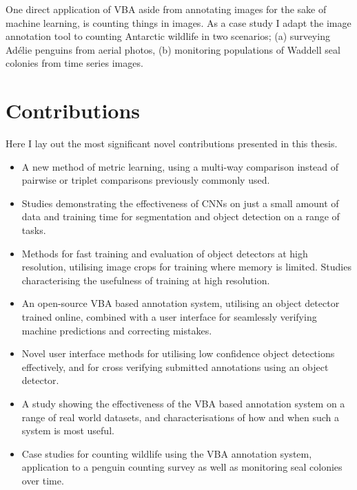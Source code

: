 One direct application of \gls{VBA} aside from annotating images for the sake of machine learning, is counting things in images. As a case study I adapt the image annotation tool to counting Antarctic wildlife in two scenarios; (a) surveying Ad\'elie penguins from aerial photos, (b) monitoring populations of Waddell seal colonies from time series images.

\section {Contributions}
\label{sec: contributions}

Here I lay out the most significant novel contributions presented in this thesis. 

\begin{itemize}

    \item A new method of metric learning, using a multi-way comparison instead of pairwise or triplet comparisons previously commonly used.
    
    \item Studies demonstrating the effectiveness of \gls{CNN}s on just a small amount of data and training time for segmentation and object detection on a range of tasks.
    
    \item Methods for fast training and evaluation of object detectors at high resolution, utilising image crops for training where memory is limited. Studies characterising the usefulness of training at high resolution.    
    
    \item An open-source \gls{VBA} based annotation system, utilising an object detector trained online, combined with a user interface for seamlessly verifying machine predictions and correcting mistakes.

    \item Novel user interface methods for utilising low confidence object detections effectively, and for cross verifying submitted annotations using an object detector.
    
    \item A study showing the effectiveness of the \gls{VBA} based annotation system on a range of real world datasets, and characterisations of how and when such a system is most useful.
    
    \item Case studies for counting wildlife using the \gls{VBA} annotation system, application to a penguin counting survey as well as monitoring seal colonies over time. 
    
\end{itemize}

